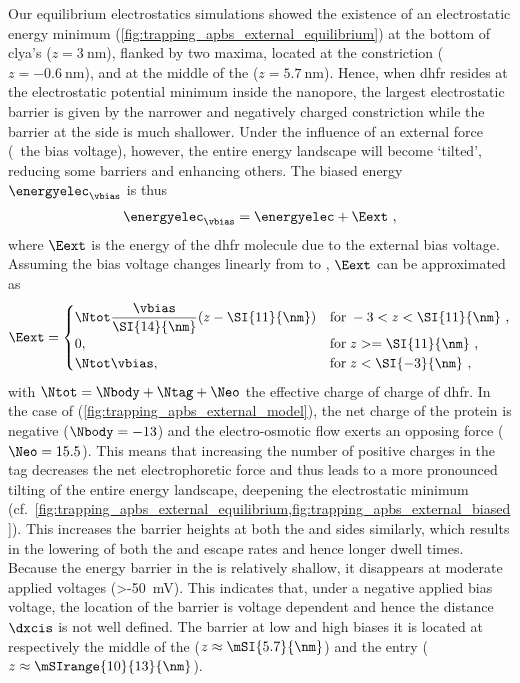 Our equilibrium electrostatics simulations showed the existence of an electrostatic energy minimum
(\cref{fig:trapping_apbs_external_equilibrium}) at the bottom of \gls{clya}'s \lumen{} ($z = \SI{3}{\nm}$),
flanked by two maxima, located at the \transi{} constriction ($z = \SI{-0.6}{\nm}$), and at the middle of the
\cisi{} \lumen{} ($z = \SI{5.7}{\nm}$). Hence, when \gls{dhfr} resides at the electrostatic potential minimum
inside the nanopore, the largest electrostatic barrier is given by the narrower and negatively charged
\transi{} constriction while the barrier at the \cisi{} side is much shallower. Under the influence of an
external force (\ie~the bias voltage), however, the entire energy landscape will become `tilted', reducing
some barriers and enhancing others. The biased energy $\energyelec_{\vbias}$ is thus
%
\begin{align}\label{eq:external_energy}
  \energyelec_{\vbias} =  \energyelec + \Eext
  \text{ ,}
\end{align}
%
where $\Eext$ is the energy of the \gls{dhfr} molecule due to the external bias voltage. Assuming the bias
voltage changes linearly from \cisi{} to \transi{}, $\Eext$ can be approximated as
%
\begin{align}\label{eq:external_energy_model}
  \Eext =
  \begin{cases}
      \Ntot \dfrac{\vbias}{\SI{14}{\nm}} (z - \SI{11}{\nm})
              & \text{for}\; -3 < z < \SI{11}{\nm} \text{ ,} \\
      0,      & \text{for}\;  z >= \SI{11}{\nm} \text{ ,}\\
      \Ntot \vbias, & \text{for}\;  z <  \SI{-3}{\nm} \text{ ,}
  \end{cases}
\end{align}
%
with $\Ntot = \Nbody + \Ntag + \Neo$ the effective charge of charge of \gls{dhfr}. In the case of
 (\cref{fig:trapping_apbs_external_model}), the net charge of the protein is negative
($\Nbody = -13$) and the electro-osmotic flow exerts an opposing force ($\Neo = 15.5$). This means that
increasing the number of positive charges in the tag decreases the net electrophoretic force and thus leads to
a more pronounced tilting of the entire energy landscape, deepening the electrostatic minimum
(cf.~\cref{fig:trapping_apbs_external_equilibrium,fig:trapping_apbs_external_biased}). This increases the
barrier heights at both the \cisi{} and \transi{} sides similarly, which results in the lowering of both the
\cisi{} and \transi{} escape rates and hence longer dwell times. Because the \cisi{} energy barrier in the
\lumen{} is relatively shallow, it disappears at moderate applied voltages (\SI{>-50}{\mV}). This indicates
that, under a negative applied bias voltage, the location of the \cisi{} barrier is voltage dependent and
hence the distance $\dxcis$ is not well defined. The \cisi{} barrier at low and high biases it is located at
respectively the middle of the \lumen{} ($z \approx \mSI{5.7}{\nm}$) and the \cisi{} entry ($z \approx
\mSIrange{10}{13}{\nm}$).

